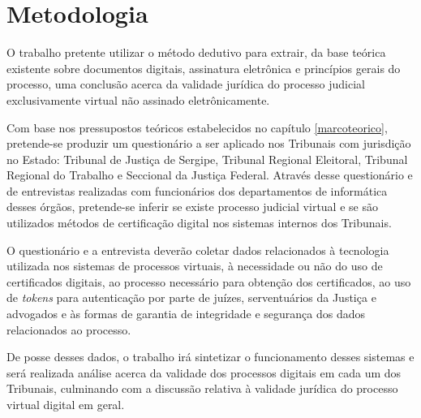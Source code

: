  \chapter{Metodologia}

	O trabalho pretente utilizar o método dedutivo para extrair, da
  base teórica existente sobre documentos digitais, assinatura
  eletrônica e princípios gerais do processo, uma conclusão
  acerca da validade jurídica do processo judicial exclusivamente
  virtual não assinado eletrônicamente.\par

  Com base nos pressupostos teóricos estabelecidos no capítulo
  \ref{marcoteorico}, pretende-se produzir um questionário a ser
  aplicado nos Tribunais com jurisdição no Estado: Tribunal de
  Justiça de Sergipe, Tribunal Regional Eleitoral, Tribunal
  Regional do Trabalho e Seccional da Justiça Federal. Através
  desse questionário e de entrevistas realizadas com funcionários
  dos departamentos de informática desses órgãos, pretende-se
  inferir se existe processo judicial virtual e se são utilizados
  métodos de certificação digital nos sistemas internos dos
  Tribunais. \par

  O questionário e a entrevista deverão coletar dados
  relacionados à tecnologia utilizada nos sistemas de processos
  virtuais, à necessidade ou não do uso de certificados
  digitais, ao processo necessário para obtenção dos
  certificados, ao uso de \emph{tokens} para autenticação por
  parte de juízes, serventuários da Justiça e advogados e às
  formas de garantia de integridade e segurança dos dados
  relacionados ao processo.\par

  De posse desses dados, o trabalho irá sintetizar o
  funcionamento desses sistemas e será realizada análise acerca
  da validade dos processos digitais em cada um dos
  Tribunais, culminando com a discussão relativa à validade
  jurídica do processo virtual digital em geral.\par
